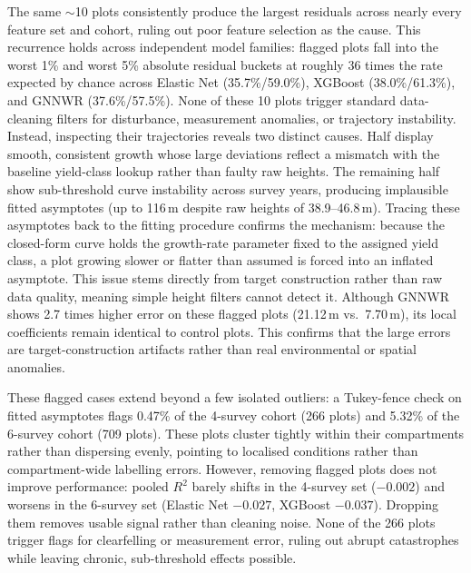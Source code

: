 \documentclass[logo,msc,ai]{infthesis}           %
\begin{document}
The same $\sim$10 plots consistently produce the largest residuals across nearly every feature set and cohort, ruling out poor feature selection as the cause. This recurrence holds across independent model families: flagged plots fall into the worst 1\% and worst 5\% absolute residual buckets at roughly 36 times the rate expected by chance across Elastic Net (35.7\%/59.0\%), XGBoost (38.0\%/61.3\%), and GNNWR (37.6\%/57.5\%).  None of these 10 plots trigger standard data-cleaning filters for disturbance, measurement anomalies, or trajectory instability. Instead, inspecting their trajectories reveals two distinct causes. Half display smooth, consistent growth whose large deviations reflect a mismatch with the baseline yield-class lookup rather than faulty raw heights. The remaining half show sub-threshold curve instability across survey years, producing implausible fitted asymptotes (up to 116\,m despite raw heights of 38.9--46.8\,m). Tracing these asymptotes back to the fitting procedure confirms the mechanism: because the closed-form curve holds the growth-rate parameter fixed to the assigned yield class, a plot growing slower or flatter than assumed is forced into an inflated asymptote. This issue stems directly from target construction rather than raw data quality, meaning simple height filters cannot detect it. Although GNNWR shows 2.7 times higher error on these flagged plots (21.12\,m vs.\ 7.70\,m), its local coefficients remain identical to control plots. This confirms that the large errors are target-construction artifacts rather than real environmental or spatial anomalies.

These flagged cases extend beyond a few isolated outliers: a Tukey-fence check on fitted asymptotes flags 0.47\% of the 4-survey cohort (266 plots) and 5.32\% of the 6-survey cohort (709 plots). These plots cluster tightly within their compartments rather than dispersing evenly, pointing to localised conditions rather than compartment-wide labelling errors. However, removing flagged plots does not improve performance: pooled $R^2$ barely shifts in the 4-survey set ($-0.002$) and worsens in the 6-survey set (Elastic Net $-0.027$, XGBoost $-0.037$). Dropping them removes usable signal rather than cleaning noise. None of the 266 plots trigger flags for clearfelling or measurement error, ruling out abrupt catastrophes while leaving chronic, sub-threshold effects possible.
\end{document}
